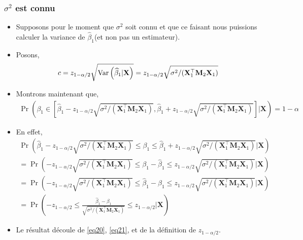 \begin{frame}[allowframebreaks]\frametitle{$\sigma^2$ est connu}
\begin{itemize}
\item Supposons pour le moment que $\sigma^2$ soit connu et que ce faisant nous puissions calculer la variance de $\widehat{\beta}_1$(et non pas un estimateur). 
\item Posons,
\begin{align*}
c = z_{1-\alpha/2}\sqrt{\mathrm{Var}\left(\widehat{\beta}_1| \mathbf{X} \right)}=z_{1-\alpha/2}\sqrt{\sigma^2/(\mathbf{X}_1^\top\mathbf{M}_2\mathbf{X}_1)}
\end{align*}
\item Montrons maintenant que,
\begin{align*}
\Pr\left(
\beta_1 \in \left[\widehat{\beta}_1 -z_{1-\alpha/2}\sqrt{\sigma^2/(\mathbf{X}_1^\top\mathbf{M}_2\mathbf{X}_1)} , \widehat{\beta}_1+
z_{1-\alpha/2}\sqrt{\sigma^2/(\mathbf{X}_1^\top\mathbf{M}_2\mathbf{X}_1)} \right] | \mathbf{X}\right) = 1-\alpha
\end{align*}
\item En effet,
\begin{align}
\Pr\left(
\widehat{\beta}_1 -z_{1-\alpha/2}\sqrt{\sigma^2/(\mathbf{X}_1^\top\mathbf{M}_2\mathbf{X}_1)}
\leq \beta_1 \leq
\widehat{\beta}_1+
z_{1-\alpha/2}\sqrt{\sigma^2/(\mathbf{X}_1^\top\mathbf{M}_2\mathbf{X}_1)}  | \mathbf{X}
\right) \nonumber\\
=\Pr\left(
-z_{1-\alpha/2}\sqrt{\sigma^2/(\mathbf{X}_1^\top\mathbf{M}_2\mathbf{X}_1)}
\leq \beta_1 - \widehat{\beta}_1 \leq
z_{1-\alpha/2}\sqrt{\sigma^2/(\mathbf{X}_1^\top\mathbf{M}_2\mathbf{X}_1)}  | \mathbf{X}
\right)\nonumber\\
=\Pr\left(
-z_{1-\alpha/2}\sqrt{\sigma^2/(\mathbf{X}_1^\top\mathbf{M}_2\mathbf{X}_1)}
\leq  \widehat{\beta}_1-\beta_1 \leq
z_{1-\alpha/2}\sqrt{\sigma^2/(\mathbf{X}_1^\top\mathbf{M}_2\mathbf{X}_1)}  | \mathbf{X}
\right)\nonumber\\
=
\Pr\left(
-z_{1-\alpha/2}
\leq  \frac{\widehat{\beta}_1-\beta_1}{\sqrt{\sigma^2/(\mathbf{X}_1^\top\mathbf{M}_2\mathbf{X}_1)}} \leq
z_{1-\alpha/2}  | \mathbf{X}
\right)
\label{eq21}
\end{align}
\item Le résultat découle de \eqref{eq20}, \eqref{eq21}, et de la définition de $z_{1-\alpha/2}$.
\end{itemize}
\end{frame}

